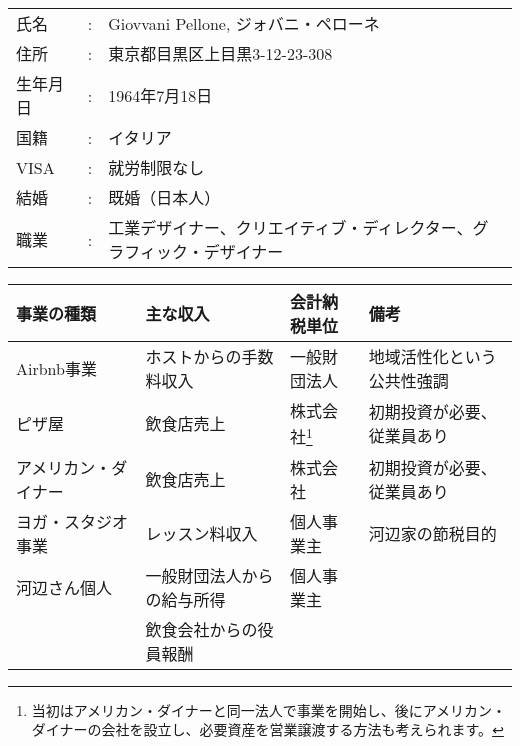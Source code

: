 
\section{}
\subsection{}

\begin{coloritemize}
\begin{spacing}{0.95}
  \item 
  \item 
  \item 
  \item 
\end{spacing}
\end{coloritemize}

\begin{table}[h]
  \begin{tabular}{lcp{28em}}
    氏名 & : & Giovvani Pellone, ジォバニ・ペローネ \\
    住所 & : & 東京都目黒区上目黒3-12-23-308 \\
    生年月日 & : & 1964年7月18日 \\
    国籍 & : & イタリア \\
    VISA & : & 就労制限なし \\
    結婚 & : & 既婚（日本人） \\
    職業 & : & 工業デザイナー、クリエイティブ・ディレクター、グラフィック・デザイナー \\
  \end{tabular}
\end{table}

\begin{minipage}{120mm}
  \begin{tabular}{llll}
\hline
 事業の種類   & 主な収入 & 会計納税単位 & 備考 \\
\hline
  Airbnb事業 & ホストからの手数料収入 & 一般財団法人 & 地域活性化という公共性強調 \\
  ピザ屋 & 飲食店売上 & 株式会社\footnote{当初はアメリカン・ダイナーと同一法人で事業を開始し、後にアメリカン・ダイナーの会社を設立し、必要資産を営業譲渡する方法も考えられます。} & 初期投資が必要、従業員あり \\
  アメリカン・ダイナー & 飲食店売上 & 株式会社 & 初期投資が必要、従業員あり \\
  ヨガ・スタジオ事業 & レッスン料収入 & 個人事業主 & 河辺家の節税目的 \\
  河辺さん個人 & 一般財団法人からの給与所得 & 個人事業主 & \\
  & 飲食会社からの役員報酬 &  & \\
  \hline
  \end{tabular}
\end{minipage}
